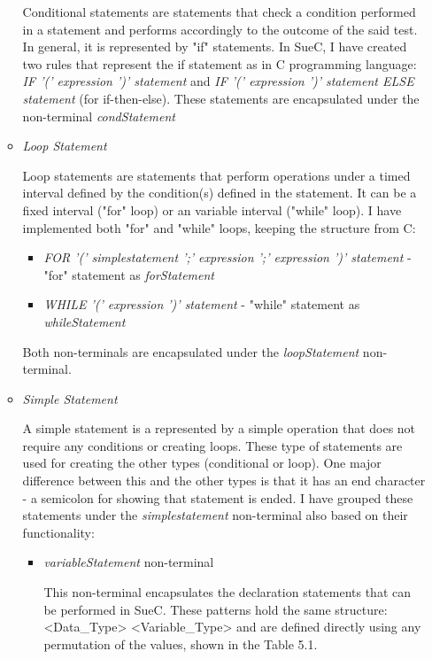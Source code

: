 \documentclass[12pt,a4paper,twoside]{report}
\begin{document}
\begin{enumerate}
\begin{itemize}
	Conditional statements are statements that check a condition performed in a statement and performs accordingly to the outcome of the said test. In general, it is represented by "if" statements. In SueC, I have created two rules that represent the if statement as in C programming language: \textit{IF '(' expression ')' statement} and \textit{IF '(' expression ')' statement ELSE statement} (for if-then-else). These statements are encapsulated under the non-terminal \textit{condStatement}
	
	\item \textit{Loop Statement}
	
	Loop statements are statements that perform operations under a timed interval defined by the condition(s) defined in the statement. It can be a fixed interval ("for" loop) or an variable interval ("while" loop). I have implemented both "for" and "while" loops, keeping the structure from C:
	\begin{itemize}
	\item \textit{FOR '(' simplestatement ';' expression ';' expression ')' statement} - "for" statement as \textit{forStatement}
	\item \textit{WHILE '(' expression ')' statement} - "while" statement as  \textit{whileStatement}
	\end{itemize}
	Both non-terminals are encapsulated under the \textit{loopStatement} non-terminal.
	\item \textit{Simple Statement}
	
	A simple statement is a represented by a simple operation that does not require any conditions or creating loops. These type of statements are used for creating the other types (conditional or loop). One major difference between this and the other types is that it has an end character - a semicolon for showing that statement is ended. I have grouped these statements under the \textit{simplestatement} non-terminal also based on their functionality: 
	\begin{itemize}
		\item \textit{variableStatement} non-terminal
		
		This non-terminal encapsulates the declaration statements that can be performed in SueC. These patterns hold the same structure: <Data\_Type> <Variable\_Type> and are defined directly using any permutation of the values, shown in the Table 5.1.
		\begin{table}[H]
\centering



\end{table}
\end{itemize}
\end{itemize}
\end{enumerate}
\end{document}
